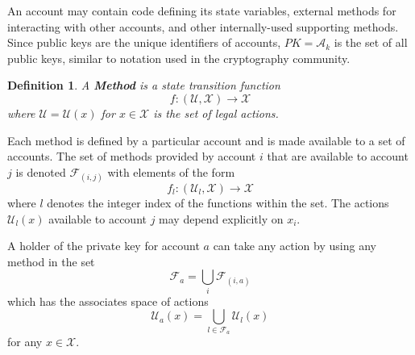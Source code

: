 \documentclass[letterpaper, 10 pt, conference]{ieeeconf}  %
\newtheorem{definition}{Definition}
\begin{document}
An account may contain code defining its state variables, external methods for interacting with other accounts, and other internally-used supporting methods. Since public keys are the unique identifiers of accounts, $PK=\mathcal{A}_k$ is the set of all public keys, similar to notation used in the cryptography community. 

\begin{definition}
A \textbf{Method} is a state transition function
\begin{equation}
f:(\mathcal{U}, \mathcal{X}) \rightarrow \mathcal{X}
\end{equation} 
where $\mathcal{U}=\mathcal{U}(x)$ for $x\in \mathcal{X}$ is the set of legal actions.
\end{definition}


Each method is defined by a particular account and is made available to a set of accounts. The set of methods provided by account $i$ that are available to account $j$ is denoted $\mathcal{F}_{(i,j)}$ with elements of the form 
\begin{equation}
f_l:(\mathcal{U}_l, \mathcal{X}) \rightarrow \mathcal{X}
\end{equation} 
where $l$ denotes the integer index of the functions within the set. The actions $\mathcal{U}_l(x)$ available to account $j$ may depend explicitly on $x_i$.

A holder of the private key for account $a$ can take any action by using any method in the set 
\begin{equation}
   \mathcal{F}_a = \bigcup_{i}\mathcal{F}_{(i,a)} 
\end{equation}
which has the associates space of actions
\begin{equation}
    \mathcal{U}_a(x) = \bigcup_{l\in \mathcal{F}_a} \mathcal{U}_l(x)
\end{equation}
for any $x\in\mathcal{X}$. %
\end{document}
